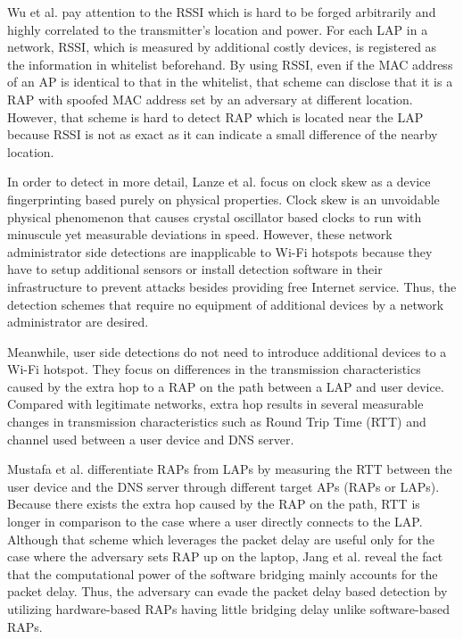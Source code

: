 \documentclass[conference]{IEEEtran}
\begin{document}
Wu et al. \cite{prapd} pay attention to the RSSI which is hard to be forged arbitrarily and highly correlated to the transmitter's location and power.
For each LAP in a network, RSSI, which is measured by additional costly devices, is registered as the information in whitelist beforehand.
By using RSSI, even if the MAC address of an AP is identical to that in the whitelist, that scheme can disclose that it is a RAP with spoofed MAC address set by an adversary at different location.
However, that scheme is hard to detect RAP which is located near the LAP because RSSI is not as exact as it can indicate a small difference of the nearby location. 

In order to detect in more detail, Lanze et al. \cite{clockskew} focus on clock skew as a device fingerprinting based purely on physical properties.
Clock skew is an unvoidable physical phenomenon that causes crystal oscillator based clocks to run with minuscule yet measurable deviations in speed.
However, these network administrator side detections are inapplicable to Wi-Fi hotspots because they have to setup additional sensors or install detection software in their infrastructure to prevent attacks besides providing free Internet service.
Thus, the detection schemes that require no equipment of additional devices by a network administrator are desired.

Meanwhile, user side detections do not need to introduce additional devices to a Wi-Fi hotspot. 
They focus on differences in the transmission characteristics caused by the extra hop to a RAP on the path between a LAP and user device. 
Compared with legitimate networks, extra hop results in several measurable changes in transmission characteristics such as Round Trip Time (RTT) and channel used between a user device and DNS server.

Mustafa et al. \cite{rtt} differentiate RAPs from LAPs by measuring the RTT between the user device and the DNS server through different target APs (RAPs or LAPs).
Because there exists the extra hop caused by the RAP on the path, RTT is longer in comparison to the case where a user directly connects to the LAP.
Although that scheme which leverages the packet delay are useful only for the case where the adversary sets RAP up on the laptop, Jang et al. \cite{previous} reveal the fact that the computational power of the software bridging mainly accounts for the packet delay.
Thus, the adversary can evade the packet delay based detection by utilizing hardware-based RAPs having little bridging delay unlike software-based RAPs.
\end{document}
